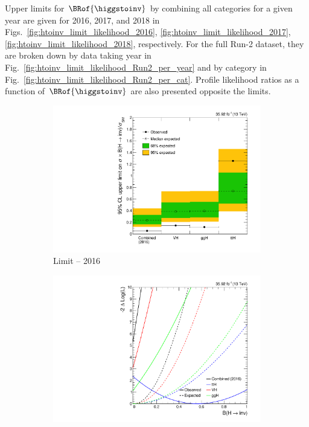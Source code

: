 
Upper limits for $\BRof{\higgstoinv}$ by combining all categories for a given year are given for 2016, 2017, and 2018 in Figs.~\ref{fig:htoinv_limit_likelihood_2016}, \ref{fig:htoinv_limit_likelihood_2017}, \ref{fig:htoinv_limit_likelihood_2018}, respectively. For the full Run-2 dataset, they are broken down by data taking year in Fig.~\ref{fig:htoinv_limit_likelihood_Run2_per_year} and by category in Fig.~\ref{fig:htoinv_limit_likelihood_Run2_per_cat}. Profile likelihood ratios as a function of $\BRof{\higgstoinv}$ are also presented opposite the limits.

\begin{figure}[htbp]
    \centering
    \begin{subfigure}[t]{0.45\textwidth}  %
        \includegraphics[width=\textwidth]{figures/limits/per_year/limit_2016_comb.pdf}
        \caption{Limit -- 2016}
    \end{subfigure}
    \hspace{0.05\textwidth}
    \begin{subfigure}[t]{0.45\textwidth}
        \includegraphics[width=\textwidth]{figures/likelihood_scan/profile_likelihood_scan_2016.pdf}

\end{subfigure}
\end{figure}
